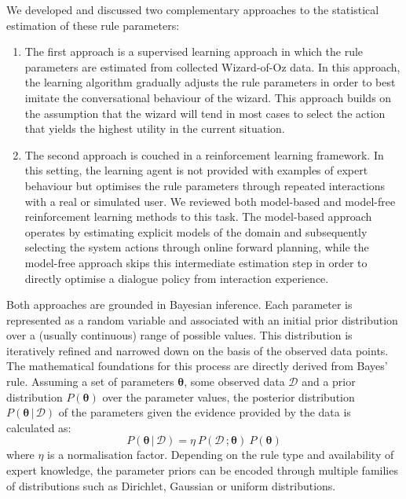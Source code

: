 We developed and discussed two complementary approaches to the statistical estimation of these rule parameters:
\begin{enumerate}
\item The first approach is a supervised learning approach in which the rule parameters are estimated from collected Wizard-of-Oz data.  In this approach, the learning algorithm gradually adjusts the rule parameters in order to best imitate the conversational behaviour of the wizard. This approach builds on the assumption that the wizard will tend in most cases to select the action that yields the highest utility in the current situation. 
\item The second approach is couched in a reinforcement learning framework.  In this setting, the learning agent is not provided with examples of expert behaviour but optimises the rule parameters through repeated interactions with a real or simulated user. We reviewed both model-based and model-free reinforcement learning methods to this task.  The model-based approach operates by estimating explicit models of the domain and subsequently selecting the system actions through online forward planning, while the model-free approach skips this intermediate estimation step in order to directly optimise a dialogue policy from interaction experience. 
\end{enumerate}

Both approaches are grounded in Bayesian inference.  Each parameter is represented as a random variable and associated with an initial prior distribution over a (usually continuous) range of possible values. This distribution is iteratively refined and narrowed down on the basis of the observed data points. The mathematical foundations for this process are directly derived from Bayes' rule. Assuming a set of parameters $\boldsymbol\theta$, some observed data $\mathcal{D}$ and a prior distribution $P(\boldsymbol\theta)$ over the parameter values, the posterior distribution $P(\boldsymbol\theta \, | \, \mathcal{D})$ of the parameters given the evidence provided by the data is calculated as:
\begin{equation}
P(\boldsymbol\theta \, | \, \mathcal{D}) = \eta \ P(\mathcal{D} \,; \boldsymbol\theta) \ P(\boldsymbol\theta)
\end{equation}
where $\eta$ is a normalisation factor. Depending on the rule type and availability of expert knowledge, the parameter priors can be encoded through multiple families of distributions such as Dirichlet, Gaussian or uniform distributions. 

